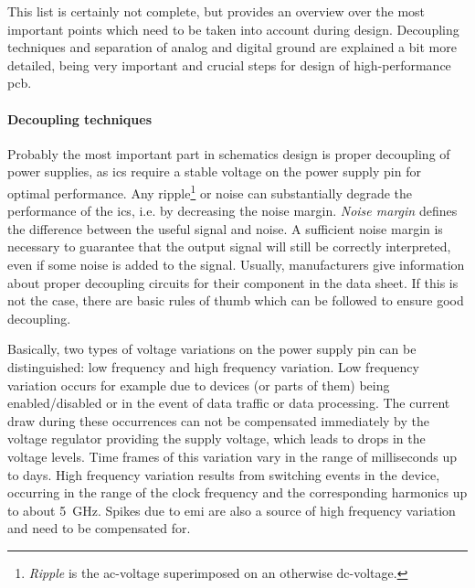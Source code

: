 This list is certainly not complete, but provides an overview over the most important points which need to be taken into account during design.
Decoupling techniques and separation of analog and digital ground are explained a bit more detailed, being very important and crucial steps for design of high-performance \gls{pcb}.
 
\paragraph{Decoupling techniques}
Probably the most important part in schematics design is proper decoupling of power supplies, as \glspl{ic} require a stable voltage on the power supply pin for optimal performance.
Any ripple\footnote{\textit{Ripple} is the \gls{ac}-voltage superimposed on an otherwise \gls{dc}-voltage.} or noise can substantially degrade the performance of the \glspl{ic}, i.e. by decreasing the noise margin.
\textit{Noise margin} defines the difference between the useful signal and noise. 
A sufficient noise margin is necessary to guarantee that the output signal will still be correctly interpreted, even if some noise is added to the signal.
Usually, manufacturers give information about proper decoupling circuits for their component in the data sheet.
If this is not the case, there are basic rules of thumb which can be followed to ensure good decoupling. \cite{decouple}

Basically, two types of voltage variations on the power supply pin can be distinguished: low frequency and high frequency variation.
Low frequency variation occurs for example due to devices (or parts of them) being enabled/disabled or in the event of data traffic or data processing.
The current draw during these occurrences can not be compensated immediately by the voltage regulator providing the supply voltage, which leads to drops in the voltage levels.
Time frames of this variation vary in the range of milliseconds up to days.
High frequency variation results from switching events in the device, occurring in the range of the clock frequency and the corresponding harmonics up to about \SI{5}{\giga \hertz}.
Spikes due to \gls{emi} are also a source of high frequency variation and need to be compensated for. \cite{xilDecouple} 

